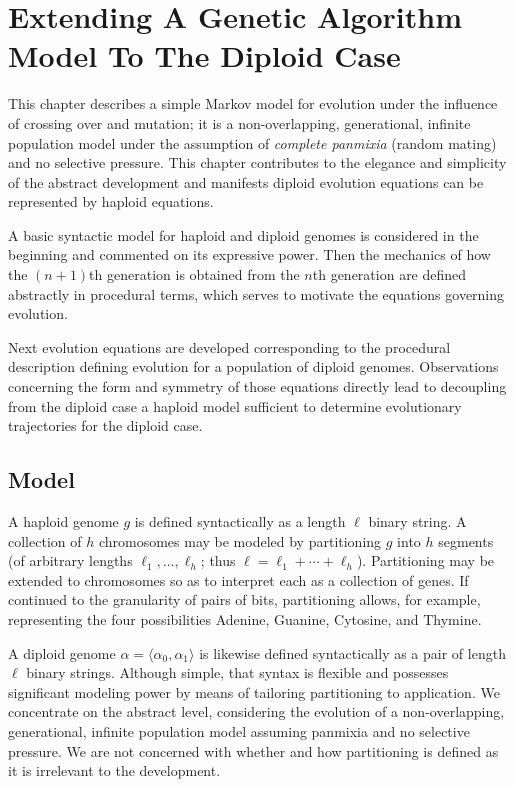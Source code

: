 \chapter{Extending A Genetic Algorithm Model To The Diploid Case} \label{ch:GA model Diploid}

This chapter describes a simple Markov model for evolution under the
influence of crossing over and mutation; it is a non-overlapping,
generational, infinite population model under the assumption of {\em complete panmixia} (random mating) and no
selective pressure. This chapter contributes to the elegance and
simplicity of the abstract development and manifests diploid evolution equations can be represented by haploid equations.

A basic syntactic model for haploid and diploid genomes is considered in the beginning and commented on its expressive power. Then the mechanics of how the $(n+1)$th generation is obtained from the $n$th generation are
defined abstractly in procedural terms, which serves to motivate the equations governing evolution.

Next evolution equations are developed corresponding to the
procedural description defining evolution for a population of
diploid genomes. Observations concerning the form and symmetry of
those equations directly lead to decoupling from the diploid case a
haploid model sufficient to determine evolutionary trajectories for
the diploid case.    

\section{Model} \label{Model}
A haploid genome $g$ is defined syntactically as a length $\ell$
binary string.  A collection of $h$ chromosomes may be modeled by
partitioning $g$ into $h$ segments (of arbitrary lengths $\ell_1,
\ldots , \ell_h$; thus $\ell = \ell_1 + \cdots + \ell_h$).
Partitioning may be extended to chromosomes so as to interpret each as
a collection of genes.  If continued to the granularity of pairs of
bits, partitioning allows, for example, representing the four
possibilities Adenine, Guanine, Cytosine, and Thymine.

A diploid genome $\alpha = \langle \alpha_0, \alpha_1 \rangle$ is
likewise defined syntactically as a pair of length $\ell$ binary
strings.  Although simple, that syntax is flexible and possesses
significant modeling power by means of tailoring partitioning to
application.  We concentrate on the abstract level, considering the
evolution of a non-overlapping, generational, infinite population
model assuming panmixia and no selective pressure. We are not concerned with 
whether and how partitioning is defined as it is irrelevant 
to the development.

